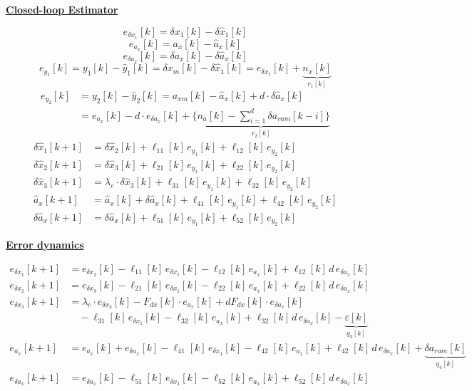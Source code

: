 \documentclass[11pt,a4paper]{ctexart}
\newcommand{\lc}{\lambda_c}
\newcommand{\hd}[1]{\par\medskip\noindent\underline{\textbf{#1}}\par\nobreak\vspace{0.2ex}}
\begin{document}
\newpage
\hd{Closed-loop Estimator}
\[ e_{\delta x_1}[k] = \delta x_1[k] - \delta \hat x_1[k] \]
\[ e_{a_x}[k] = a_x[k] - \hat a_x[k] \]
\[ e_{\delta a_x}[k] = \delta a_x[k] - \delta \hat a_x[k] \]
\[ e_{y_1}[k] = y_1[k] - \hat y_1[k] = \delta x_m[k] - \delta \hat x_1[k] = e_{\delta x_1}[k] + \underbrace{n_x[k]}_{r_1[k]} \]
\[
\begin{aligned}
e_{y_2}[k] &= y_2[k] - \hat y_2[k] = a_{xm}[k] - \hat a_x[k] + d\cdot \delta \hat a_x[k] \\
&= e_{a_x}[k] - d\cdot e_{\delta a_x}[k] + \underbrace{\Big\{ n_a[k] - \textstyle\sum_{i=1}^{d}\delta a_{ram}[k-i] \Big\}}_{r_2[k]}
\end{aligned}
\]
\[
\begin{aligned}
\delta \hat x_1[k+1] &= \delta \hat x_2[k] + \ell_{11}[k]\, e_{y_1}[k] + \ell_{12}[k]\, e_{y_2}[k] \\
\delta \hat x_2[k+1] &= \delta \hat x_3[k] + \ell_{21}[k]\, e_{y_1}[k] + \ell_{22}[k]\, e_{y_2}[k] \\
\delta \hat x_3[k+1] &= \lc \cdot \delta \hat x_3[k] + \ell_{31}[k]\, e_{y_1}[k] + \ell_{32}[k]\, e_{y_2}[k] \\
\hat a_x[k+1] &= \hat a_x[k] + \delta \hat a_x[k] + \ell_{41}[k]\, e_{y_1}[k] + \ell_{42}[k]\, e_{y_2}[k] \\
\delta \hat a_x[k+1] &= \delta \hat a_x[k] + \ell_{51}[k]\, e_{y_1}[k] + \ell_{52}[k]\, e_{y_2}[k]
\end{aligned}
\]

\hd{Error dynamics}
\[
\begin{aligned}
e_{\delta x_1}[k+1] &= e_{\delta x_2}[k] - \ell_{11}[k]\, e_{\delta x_1}[k] - \ell_{12}[k]\, e_{a_x}[k] + \ell_{12}[k]\, d\, e_{\delta a_x}[k] \\
e_{\delta x_2}[k+1] &= e_{\delta x_3}[k] - \ell_{21}[k]\, e_{\delta x_1}[k] - \ell_{22}[k]\, e_{a_x}[k] + \ell_{22}[k]\, d\, e_{\delta a_x}[k] \\
e_{\delta x_3}[k+1] &= \lc \cdot e_{\delta x_3}[k] - F_{dx}[k]\cdot e_{a_x}[k] + dF_{dx}[k]\cdot e_{\delta a_x}[k] \\
&\quad - \ell_{31}[k]\, e_{\delta x_1}[k] - \ell_{32}[k]\, e_{a_x}[k] + \ell_{32}[k]\, d\, e_{\delta a_x}[k] - \underbrace{\varepsilon[k]}_{q_3[k]} \\
e_{a_x}[k+1] &= e_{a_x}[k] + e_{\delta a_x}[k] - \ell_{41}[k]\, e_{\delta x_1}[k] - \ell_{42}[k]\, e_{a_x}[k] + \ell_{42}[k]\, d\, e_{\delta a_x}[k] + \underbrace{\delta a_{ram}[k]}_{q_4[k]} \\
e_{\delta a_x}[k+1] &= e_{\delta a_x}[k] - \ell_{51}[k]\, e_{\delta x_1}[k] - \ell_{52}[k]\, e_{a_x}[k] + \ell_{52}[k]\, d\, e_{\delta a_x}[k]
\end{aligned}
\]
\end{document}

